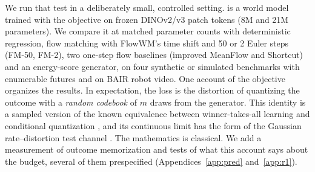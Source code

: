 We run that test in a deliberately small, controlled setting. \imlewm{} is a world model trained with the \nom{} objective on frozen DINOv2/v3 patch tokens (8M and 21M parameters). We compare it at matched parameter counts with deterministic regression, flow matching with FlowWM's time shift and 50 or 2 Euler steps (FM-50, FM-2), two one-step flow baselines (improved MeanFlow and Shortcut) and an energy-score generator, on four synthetic or simulated benchmarks with enumerable futures and on BAIR robot video. One account of the objective organizes the results. In expectation, the \nom{} loss is the distortion of quantizing the outcome with a \emph{random codebook} of $m$ draws from the generator. This identity is a sampled version of the known equivalence between winner-takes-all learning and conditional quantization \citep{rupprecht2017mhp,letzelter2024wta,perera2024amcl}, and its continuous limit has the form of the Gaussian rate--distortion test channel \citep{shannon1959coding,cover2006elements}. The mathematics is classical. We add a measurement of outcome memorization and tests of what this account says about the budget, several of them prespecified (Appendices~\ref{app:pred} and~\ref{app:r1}).

